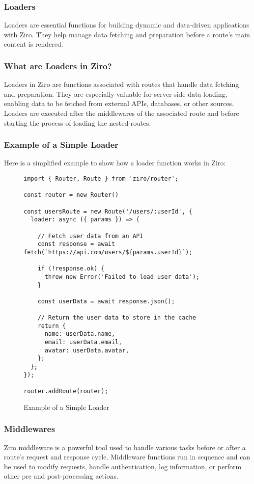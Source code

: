\subsubsection{Loaders}
Loaders are essential functions for building dynamic and data-driven applications with Ziro. They help manage data fetching and preparation before a route’s main content is rendered.

\subsubsection*{What are Loaders in Ziro?}
Loaders in Ziro are functions associated with routes that handle data fetching and preparation. They are especially valuable for server-side data loading, enabling data to be fetched from external APIs, databases, or other sources. Loaders are executed after the middlewares of the associated route and before starting the process of loading the nested routes.

\pagebreak
\subsubsection*{Example of a Simple Loader}
Here is a simplified example to show how a loader function works in Ziro:
\begin{figure}[h!]
\begin{verbatim}
import { Router, Route } from 'ziro/router';

const router = new Router()

const usersRoute = new Route('/users/:userId', {
  loader: async ({ params }) => {

    // Fetch user data from an API
    const response = await fetch(`https://api.com/users/${params.userId}`);

    if (!response.ok) {
      throw new Error('Failed to load user data');
    }

    const userData = await response.json();

    // Return the user data to store in the cache
    return {
      name: userData.name,
      email: userData.email,
      avatar: userData.avatar,
    };
  };
});

router.addRoute(router);
\end{verbatim}
\caption{Example of a Simple Loader}
\end{figure}


\subsubsection{Middlewares}
Ziro middleware is a powerful tool used to handle various tasks before or after a route's request and response cycle. Middleware functions run in sequence and can be used to modify requests, handle authentication, log information, or perform other pre and post-processing actions.

